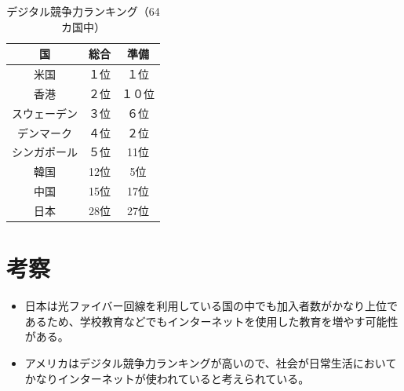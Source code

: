\documentclass[a4paper,11pt,dvipdfmx]{ujarticle}
\begin{document}
\begin{table}[htbp]
    \centering
    \caption{デジタル競争力ランキング（64カ国中）}
    \label{tbl:デジタル}
    \begin{tabular}{|c|c|c|}
        \hline
        国 & 総合 & 準備 \\
        \hline
        米国 & １位 & １位\\
        \hline 
        香港 & ２位 & １０位\\
        \hline
        スウェーデン & ３位 & ６位\\
        \hline
        デンマーク & ４位 & ２位\\
        \hline
        シンガポール & ５位 & 11位\\
        \hline
        韓国 & 12位 & 5位\\
        \hline
        中国 & 15位 & 17位\\
        \hline
        日本 & 28位 & 27位\\
        \hline
    \end{tabular}
\end{table}

\section{考察}
\begin{itemize}
    \item 日本は光ファイバー回線を利用している国の中でも加入者数がかなり上位であるため、学校教育などでもインターネットを使用した教育を増やす可能性がある。
    \item アメリカはデジタル競争力ランキングが高いので、社会が日常生活においてかなりインターネットが使われていると考えられている。
\end{itemize}
%


%


\end{document}
